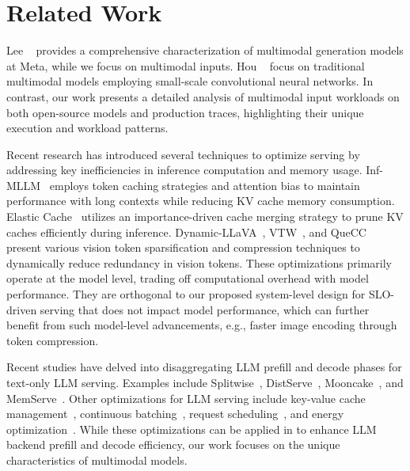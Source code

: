 \section{Related Work}

Lee \etal{}~\cite{lee2024characterizing} provides a comprehensive characterization of multimodal generation models at Meta, while we focus on multimodal inputs.
Hou \etal{}~\cite{hou2022characterizing} focus on traditional multimodal models employing small-scale convolutional neural networks.
In contrast, our work presents a detailed analysis of multimodal input workloads on both open-source \lmm models and production traces, highlighting their unique execution and workload patterns.

Recent research has introduced several techniques to optimize \lmm serving by addressing key inefficiencies in inference computation and memory usage.
Inf-MLLM~\cite{ning2024infmllm} employs token caching strategies and attention bias to maintain performance with long contexts while reducing KV cache memory consumption.
Elastic Cache~\cite{liu2025efficient} utilizes an importance-driven cache merging strategy to prune KV caches efficiently during inference.
Dynamic-LLaVA~\cite{huang2024dynamic}, VTW~\cite{lin2024boosting}, and QueCC~\cite{li2024inference} present various vision token sparsification and compression techniques to dynamically reduce redundancy in vision tokens.
These optimizations primarily operate at the model level, trading off computational overhead with model performance.
They are orthogonal to our proposed system-level design for SLO-driven \lmm serving that does not impact model performance, which can further benefit from such model-level advancements, e.g., faster image encoding through token compression.

Recent studies have delved into disaggregating LLM prefill and decode phases for text-only LLM serving.
Examples include Splitwise~\cite{patel2024splitwise}, DistServe~\cite{zhong2024distserve}, Mooncake~\cite{qin2024mooncake}, and MemServe~\cite{hu2024memserve}.
Other optimizations for LLM serving include key-value cache management~\cite{vllm}, continuous batching~\cite{orca}, request scheduling~\cite{aiops2024qiu,patke2024queue,sun2024llumnix,sarathi-serve}, and energy optimization~\cite{stojkovic2025tapas,stojkovic2024dynamollm,qiu2024muserve}.
While these optimizations can be applied in \sysname{} to enhance LLM backend prefill and decode efficiency, our work focuses on the unique characteristics of multimodal models.
